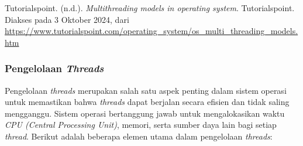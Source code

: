 \documentclass[12pt]{article}
\begin{document}
\begin{enumerate}
\end{enumerate}

\noindent Tutorialspoint. (n.d.). \textit{Multithreading models in operating system}. Tutorialspoint. Diakses pada 3 Oktober 2024, dari \url{https://www.tutorialspoint.com/operating_system/os_multi_threading_models.htm}

\subsubsection{Pengelolaan \textit{Threads}}
Pengelolaan \textit{threads} merupakan salah satu aspek penting dalam sistem operasi untuk memastikan bahwa \textit{threads} dapat berjalan secara efisien dan tidak saling mengganggu. Sistem operasi bertanggung jawab untuk mengalokasikan waktu \textit{CPU (Central Processing Unit)}, memori, serta sumber daya lain bagi setiap \textit{thread}. Berikut adalah beberapa elemen utama dalam pengelolaan \textit{threads}:
\end{document}
